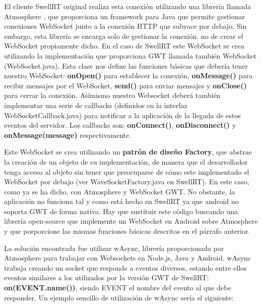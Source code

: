     El cliente SwellRT original realiza esta conexión utilizando una librería llamada Atmosphere \cite{ref:atmosphere}, que proporciona un framework para Java que permite gestionar conexiones WebSocket junto a la conexión HTTP que subyace por debajo. Sin embargo, esta librería se encarga solo de gestionar la conexión, no de crear el WebSocket propiamente dicho. En el caso de SwellRT este WebSocket se crea utilizando la implementación que proporciona GWT llamada también WebSocket (WebSocket.java). Esta clase nos define las funciones básicas que debería tener nuestro WebSocket: \textbf{onOpen()} para establecer la conexión, \textbf{onMessage()} para recibir mensajes por el WebSocket, \textbf{send()} para enviar mensajes y \textbf{onClose()} para cerrar la conexión. Asímismo nuestro Websocket deberá también implementar una serie de callbacks (definidos en la interfaz WebSocketCallback.java) para notificar a la aplicación de la llegada de estos eventos del servidor. Los callbacks son: \textbf{onConnect()}, \textbf{onDisconnect()} y \textbf{onMessage(message)} respectivamente.
	
	Este WebSocket se crea utilizando un \textbf{patrón de diseño Factory}, que abstrae la creación de un objeto de su implementación, de manera que el desarrollador tenga acceso al objeto sin tener que preocuparse de cómo este implementado el WebSocket por debajo (ver WaveSocketFactory.java en SwellRT). En este caso, como ya se ha dicho, con Atmosphere y WebSocket GWT. No obstante, la aplicación no funciona tal y como está hecho en SwellRT ya que android no soporta GWT de forma nativa. Hay que sustituir este código buscando una librería open-source que implemente un WebSocket en Android sobre Atmosphere y que porporcione las mismas funciones básicas descritas en el párrafo anterior.
	
	La solución encontrada fue utilizar wAsync\cite{ref:wAsync_github}, librería proporcionada por Atmosphere para trabajar con Websockets en Node.js, Java y Android. wAsync trabaja creando un socket que responde a eventos diversos, estando entre ellos eventos similares a los utilizados por la versión GWT de SwellRT: \textbf{on(EVENT.name())}, siendo EVENT el nombre del evento al que debe responder. Un ejemplo sencillo de utilización de wAsync sería el siguiente:
	
